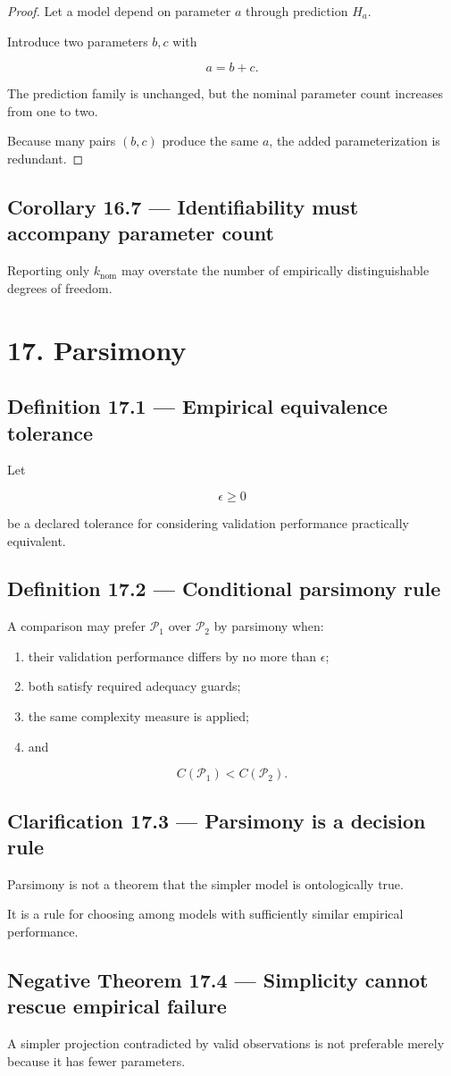 \documentclass[11pt,oneside,openany]{book}
\newcommand{\PCsection}[1]{%
  \section*{#1}\addcontentsline{toc}{section}{#1}%
}
\newcommand{\PCsubsection}[1]{%
  \subsection*{#1}%
}
\begin{document}
\begin{proof}
Let a model depend on parameter \(a\) through prediction \(H_a\).

Introduce two parameters \(b,c\) with

\[
a=b+c.
\]

The prediction family is unchanged, but the nominal parameter count increases from one to two.

Because many pairs \((b,c)\) produce the same \(a\), the added parameterization is redundant.

\end{proof}

\PCsubsection{Corollary 16.7 --- Identifiability must accompany parameter count}

Reporting only \(k_{\mathrm{nom}}\) may overstate the number of empirically distinguishable degrees of freedom.


\PCsection{17. Parsimony}

\PCsubsection{Definition 17.1 --- Empirical equivalence tolerance}

Let

\[
\epsilon\geq0
\]

be a declared tolerance for considering validation performance practically equivalent.

\PCsubsection{Definition 17.2 --- Conditional parsimony rule}

A comparison may prefer \(\mathcal P_1\) over \(\mathcal P_2\) by parsimony when:

\begin{enumerate}
\item their validation performance differs by no more than \(\epsilon\);
\item both satisfy required adequacy guards;
\item the same complexity measure is applied;
\item and
\end{enumerate}
\[
C(\mathcal P_1)<C(\mathcal P_2).
\]

\PCsubsection{Clarification 17.3 --- Parsimony is a decision rule}

Parsimony is not a theorem that the simpler model is ontologically true.

It is a rule for choosing among models with sufficiently similar empirical performance.

\PCsubsection{Negative Theorem 17.4 --- Simplicity cannot rescue empirical failure}

A simpler projection contradicted by valid observations is not preferable merely because it has fewer parameters.
\end{document}
